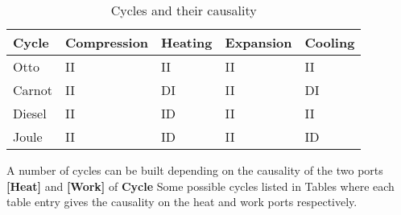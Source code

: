    \begin{table}[htbp]
     \begin{center}
       \leavevmode
       \begin{tabular}{|l|l|l|l|l|}
         \hline
         Cycle & Compression & Heating & Expansion & Cooling \\
         \hline
         Otto & II & II & II & II \\
         Carnot & II & DI & II & DI \\
         Diesel & II & ID & II & II \\
         Joule & II & ID & II & ID \\
         \hline
       \end{tabular}
       \caption{Cycles and their causality}
       \label{tab:cycles}
     \end{center}
   \end{table}
   
   A number of cycles can be built depending on the causality of the
   two ports \textbf{[Heat]} and \textbf{[Work]} of \textbf{Cycle}
   Some possible cycles listed in Tables  where each
   table entry gives the causality on the heat and work ports
   respectively.

